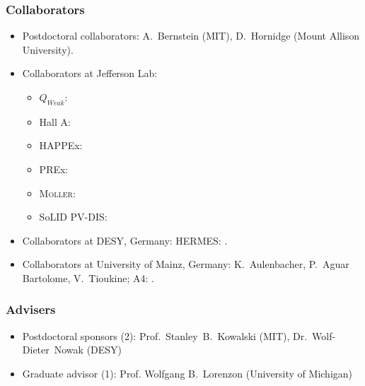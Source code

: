 \documentclass[11pt,letterpaper]{article}
\newcommand{\Qweak}{\texorpdfstring{$Q_{Weak}$}{Qweak}}
\newcommand{\Moller}{\texorpdfstring{\textsc{Moller}}{MOLLER}}
\begin{document}

\subsubsection*{Collaborators}
\begin{itemize}
 \setlength{\itemsep}{0pt}
 \setlength{\parskip}{0pt}
 \setlength{\parsep}{0pt}
 \item Postdoctoral collaborators: A.~Bernstein (MIT), D.~Hornidge (Mount Allison University).
 \item Collaborators at Jefferson Lab:
  \begin{itemize}
   \setlength{\itemsep}{0pt}
   \setlength{\parskip}{0pt}
   \setlength{\parsep}{0pt}
   \item \Qweak: 
   \item Hall A: 
   \item HAPPEx: 
   \item PREx: 
   \item \Moller: 
   \item SoLID PV-DIS: 
  \end{itemize}
 \item Collaborators at DESY, Germany: HERMES: .
 \item Collaborators at University of Mainz, Germany: K.~Aulenbacher, P.~Aguar Bartolome, V.~Tioukine; A4: .
\end{itemize}

\subsubsection*{Advisers}
\begin{itemize}
 \setlength{\itemsep}{0pt}
 \setlength{\parskip}{0pt}
 \setlength{\parsep}{0pt}
 \item Postdoctoral sponsors (2): Prof.~Stanley~B.~Kowalski (MIT),  Dr.~Wolf-Dieter~Nowak (DESY)
 \item Graduate advisor (1): Prof. Wolfgang B.~Lorenzon (University of Michigan)
\end{itemize}
\end{document}
